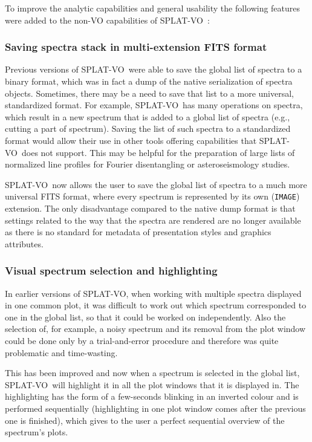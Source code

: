 \documentclass[final,authoryear,5p,times,twocolumn]{elsarticle}
\newcommand{\splatvo}{{\textsf{\small{SPLAT-VO}}}}
\begin{document}
\label{davids_functions} To improve the analytic capabilities and general
usability the following features were added to the non-VO capabilities of
\splatvo\ \citep{and146bcthesis}:

\subsubsection{Saving spectra stack in multi-extension FITS format}

Previous versions of \splatvo\ were able to save the global list of spectra to
a binary format, which was in fact a dump of the native serialization of
spectra objects. Sometimes, there may be a need to save that list to a more
universal, standardized format. For example, \splatvo\ has many operations on
spectra, which result in a new spectrum that is added to a global list of
spectra (e.g., cutting a part of spectrum). Saving the list of such spectra to
a standardized format would allow their use in other tools offering
capabilities that \splatvo\ does not support.  This may be helpful for the
preparation of large lists of normalized line profiles for Fourier
disentangling or asteroseismology studies.

\splatvo\ now allows the user to save the global list of spectra to a much more
universal FITS format, where every spectrum  is represented by its own
(\texttt{IMAGE}) extension.  The only disadvantage compared to the native dump
format is that settings related to the way that the spectra are rendered are no
longer available as there is no standard for metadata of presentation styles
and graphics attributes.

\subsubsection{Visual spectrum selection and highlighting}

In earlier versions of \splatvo, when working with multiple spectra displayed
in one common plot, it was difficult to work out which spectrum corresponded to
one in the global list, so that it could be worked on independently.  Also the
selection of, for example, a noisy spectrum and its removal from the plot
window could be done only by a trial-and-error procedure and therefore was
quite problematic and time-wasting.

This has been improved and now when a spectrum is selected in the global list,
\splatvo\ will highlight it in all the plot windows that it is displayed in.
The highlighting has the form of a few-seconds blinking in an inverted colour
and is performed sequentially (highlighting in one plot window comes after the
previous one is finished), which gives to the user a perfect sequential
overview of the spectrum's plots.
\end{document}
